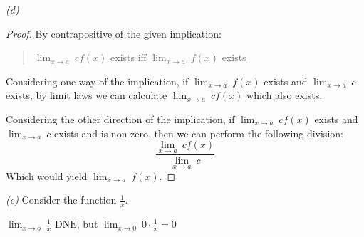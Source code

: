 \documentclass[12pt, a4paper]{article}
\newcommand{\displim}[1]{\displaystyle{\lim_{#1}}}
\begin{document}
\textit{(d)}
\begin{proof}
    By contrapositive of the given implication:

    \begin{quote}
        $\displim{x \to a}\: cf(x)$ exists iff $\displim{x \to a}\: f(x)$ exists
    \end{quote}

    Considering one way of the implication, if $\displim{x \to a}\: f(x)$ exists
    and $\displim{x \to a}\: c$ exists, by limit laws we can calculate
    $\displim{x \to a}\: cf(x)$ which also exists.

    Considering the other direction of the implication, if $\displim{x \to a}\: cf(x)$
    exists and $\displim{x \to a}\: c$ exists and is non-zero, then we can perform
    the following division:
    \[
        \frac{\displim{x \to a}\: cf(x)}{\displim{x \to a}\: c}
    \]
    Which would yield $\displim{x \to a}\: f(x)$.
\end{proof}

\textit{(e)}
Consider the function $\displaystyle{\frac{1}{x}}$.

$\displim{x \to o}\: \frac{1}{x} \text{ DNE}$, but 
$\displim{x \to 0}\: 0 \cdot \frac{1}{x} = 0$
\end{document}
